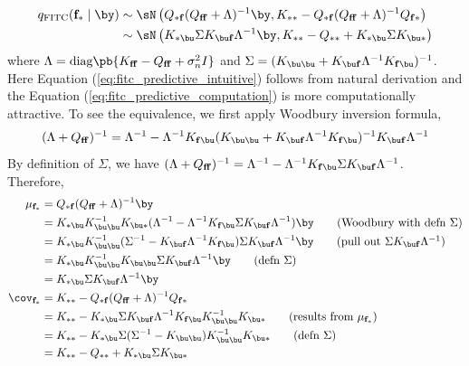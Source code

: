 \documentclass[11pt]{article}
\renewcommand\bf{\ensuremath{\mathbf{f}}}
\begin{document}
\begin{align}
    q_{\text{FITC}}(\bf_*\mid \by)
        &\sim \sN\left(
            Q_{*\bf} ( Q_{\bf\bf} + \Lambda )^{-1} \by,
            K_{**} - Q_{*\bf} ( Q_{\bf\bf} + \Lambda )^{-1} Q_{\bf*}
        \right) 
        \label{eq:fitc_predictive_intuitive}
        \\
        &\sim \sN\left(
            K_{*\bu}\Sigma K_{\bu\bf} \Lambda^{-1} \by,
            K_{**} - Q_{**} + K_{*\bu}\Sigma K_{\bu*}
        \right)
        \label{eq:fitc_predictive_computation}
\end{align}
where $\Lambda = \text{diag}\pb{ K_{\bf\bf} - Q_{\bf\bf} + \sigma_n^2 I }$ and $\Sigma = (K_{\bu\bu} + K_{\bu\bf}\Lambda^{-1}K_{\bf\bu})^{-1}$. Here Equation (\ref{eq:fitc_predictive_intuitive}) follows from natural derivation and the Equation (\ref{eq:fitc_predictive_computation}) is more computationally attractive. To see the equivalence, we first apply Woodbury inversion formula,
\begin{align}
    (\Lambda + Q_{\bf\bf})^{-1}
        = \Lambda^{-1} - \Lambda^{-1} K_{\bf\bu} (K_{\bu\bu} + K_{\bu\bf} \Lambda^{-1} K_{\bf\bu} )^{-1} K_{\bu\bf} \Lambda^{-1}
    \label{eq:fitc_woodbury_inverse}
\end{align}
By definition of $\Sigma$, we have $(\Lambda + Q_{\bf\bf})^{-1} = \Lambda^{-1} - \Lambda^{-1} K_{\bf\bu} \Sigma K_{\bu\bf} \Lambda^{-1}$. Therefore,
\begin{align*}
    \mu_{\bf_*} 
        &= Q_{*\bf} ( Q_{\bf\bf} + \Lambda )^{-1} \by  \\
        &= K_{*\bu} K_{\bu\bu}^{-1} K_{\bu*} ( \Lambda^{-1} - \Lambda^{-1} K_{\bf\bu} \Sigma K_{\bu\bf} \Lambda^{-1} ) \by 
            \tag{Woodbury with defn $\Sigma$} \\
        &= K_{*\bu} K_{\bu\bu}^{-1} ( \Sigma^{-1} - K_{\bu\bf} \Lambda^{-1} K_{\bf\bu} ) \Sigma K_{\bu\bf} \Lambda^{-1} \by 
            \tag{pull out $\Sigma K_{\bu\bf}\Lambda^{-1}$}
        \\
        &= K_{*\bu} K_{\bu\bu}^{-1} K_{\bu\bu} \Sigma K_{\bu\bf} \Lambda^{-1} \by
            \tag{defn $\Sigma$} \\
        &= K_{*\bu}\Sigma K_{\bu\bf} \Lambda^{-1} \by \\
    \cov_{\bf_*}
        &= K_{**} - Q_{*\bf} ( Q_{\bf\bf} + \Lambda )^{-1} Q_{\bf*} \\ 
        &= K_{**} - K_{*\bu}\Sigma K_{\bu\bf} \Lambda^{-1} K_{\bf\bu} K_{\bu\bu}^{-1} K_{\bu*} 
            \tag{results from $\mu_{\bf_*}$} \\
        &= K_{**} - K_{*\bu}\Sigma (\Sigma^{-1} - K_{\bu\bu}) K_{\bu\bu}^{-1} K_{\bu*} 
            \tag{defn $\Sigma$} \\
        &= K_{**} - Q_{**} + K_{*\bu}\Sigma K_{\bu*}
\end{align*}
\end{document}
